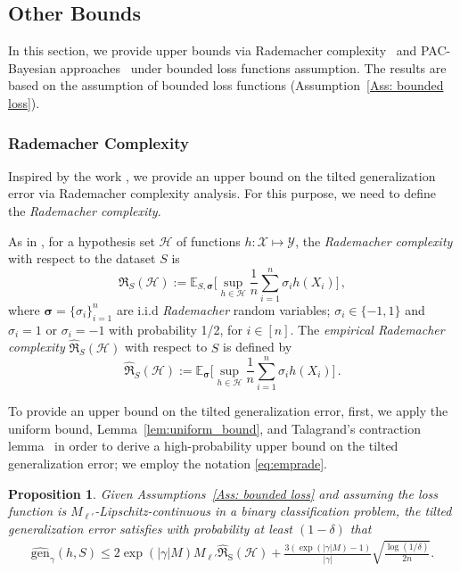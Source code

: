 \documentclass{article}
\theoremstyle{plain}
\theoremstyle{plain}
\newtheorem{proposition}[theorem]{Proposition}
\theoremstyle{definition}
\theoremstyle{remark}
\newcommand{\mbE}{\mathbb{E}}
\begin{document}
\subsection{Other Bounds}\label{app: other bounds}
In this section, we provide upper bounds via Rademacher complexity~\citep{bartlett2002rademacher} and PAC-Bayesian approaches~\citep{alquier2021user} under bounded loss functions assumption.  The results are based on the assumption of bounded loss functions  (Assumption~\ref{Ass: bounded loss}). 
\subsubsection{Rademacher Complexity}\label{sec: rad bound}
Inspired by the work \citep{bartlett2002rademacher}, we provide an upper bound on the tilted generalization error via Rademacher complexity analysis. For this purpose, we need to define the {\it Rademacher complexity}.

As in \citet{bartlett2002rademacher}, for a hypothesis set  $\mathcal{H}$ of functions $h:\mathcal{X}\mapsto \mathcal{Y}$, the  {\it Rademacher complexity}  with respect to the dataset $S$ is 
\begin{equation}
  \mathfrak{R}_{S}(\mathcal{H}):=\mbE_{S,\pmb{\sigma}}\Big[\sup_{h\in\mathcal{H}}\frac{1}{n}\sum_{i=1}^n \sigma_i h(X_i)\Big]\,, \nonumber 
\end{equation}
where $\pmb{\sigma}=\{ \sigma_i\}_{i=1}^n$ are i.i.d {\it Rademacher} random variables; $\sigma_i\in\{-1,1\}$ and $\sigma_i=1$ or $\sigma_i=-1$ with probability 1/2,
 for  $i\in[n]$. 
The {\it empirical Rademacher complexity} $\hat{\mathfrak{R}}_{S}(\mathcal{H})$ with respect to $S$ is defined by 
\begin{equation}
  \hat{\mathfrak{R}}_{S}(\mathcal{H}):=\mbE_{\pmb{\sigma}}\Big[\sup_{h\in\mathcal{H}}\frac{1}{n}\sum_{i=1}^n \sigma_i h(X_i)\Big]\,. \label{eq:emprade}
\end{equation}

To provide an upper bound on the tilted generalization error, first, we apply the uniform bound, Lemma~\ref{lem:uniform_bound}, and Talagrand’s contraction lemma~\citep{talagrand1996new} in order to derive a high-probability upper bound on the tilted generalization error; we employ the notation \eqref{eq:emprade}. 
\begin{tcolorbox}
\begin{proposition}\label{prop: rad tilted gen bound}
    Given Assumptions~\ref{Ass: bounded loss} and assuming the loss function is $M_{\ell'}$-Lipschitz-continuous in a binary classification problem, the tilted generalization error satisfies with probability at least $(1-\delta)$ that 
    \begin{equation} \nonumber 
        \begin{split}
               \widehat{\mathrm{gen}}_{\gamma}(h,S)\leq  2\exp(|\gamma| M)M_{\ell'}\hat{\mathfrak{R}}_{\mathrm{S}}(\mathcal{ H})+  \frac{3(\exp(|\gamma| M)-1)}{|\gamma|} \sqrt{\frac{\log(1/\delta)}{2n}}.
        \end{split}
    \end{equation}
\end{proposition}
\end{tcolorbox}
\end{document}
